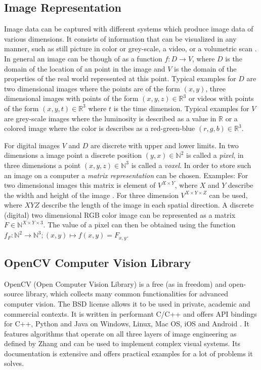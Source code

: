 \subsection{Image Representation}
Image data can be captured with different systems which produce image data of various dimensions.
It consists of information that can be visualized in any manner, such as still picture in color or grey-scale, a video, or a volumetric scan \autocite[][Chap.~1]{zhang2017imageprocessing}.
In general an image can be though of as a function $f: D \rightarrow V$, 
where $D$ is the domain of the location of an point in the image 
and $V$ is the domain of the properties of the real world represented at this point.
Typical examples for $ D $ are two dimensional images where the points are of the form $ (x, y) $, three dimensional images with points of the form $ (x, y, z) \in \mathbb{R}^3 $ or videos with points of the form $ (x, y, t) \in \mathbb{R}^3 $ where $ t $ is the time dimension.
Typical examples for $ V $ are grey-scale images where the luminosity is described as a value in $ \mathbb{R} $ or a colored image where the color is describes as a red-green-blue $ (r, g, b) \in \mathbb{R}^3 $.

For digital images $V$ and $D$ are discrete with upper and lower limits.
In two dimensions a image point a discrete position $ (y, x) \in \mathbb{N}^2 $ is called a \emph{pixel},
in three dimensions a point $ (x, y, z) \in \mathbb{N}^3 $ is called a \emph{voxel}.
In order to store such an image on a computer a \emph{matrix representation} can be chosen.
Examples:
For two dimensional images this matrix is element of $ V^{X \times Y} $, where $ X $ and $ Y $ describe the width and height of the image \autocite[][Chap.~1]{zhang2017imageprocessing}. For three dimension $ V^{X \times Y \times Z} $ can be used, where $X Y Z$ describe the length of the image in each spatial direction. 
A discrete (digital) two dimensional \ac{RGB} color image can be represented as a matrix  $ F \in \mathbb{N}^{X \times Y \times 3} $.
The value of a pixel can then be obtained using the function $ f_F: \mathbb{N}^2 \rightarrow \mathbb{N}^3 ; (x, y) \mapsto f(x,y) = F_{x,y} $.

\subsection{OpenCV Computer Vision Library}
OpenCV (Open Computer Vision Library) is a free (as in freedom) and open-source library,
which collects many common functionalities for advanced computer vision.
The \ac{BSD} license allows it to be used in private, academic and commercial contexts. 
It is written in performant C/C++ and offers \ac{API} bindings for C++, Python and Java on Windows, Linux, Mac OS, iOS and Android \autocite[][]{opencv2018opencv}.
It features algorithms that operate on all three layers of image engineering as defined by Zhang 
and can be used to implement complex visual systems. 
Its documentation is extensive and offers practical examples for a lot of problems it solves.



